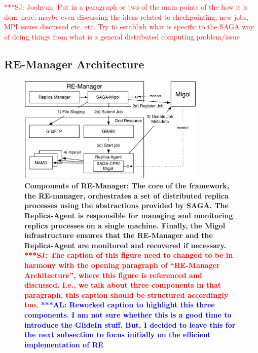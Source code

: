 \documentclass{rspublic}
\newcommand{\alnote}[1]{ {\textcolor{blue} { ***AL: #1 }}}
\newcommand{\jhanote}[1]{ {\textcolor{red} { ***SJ: #1 }}}
\newcommand{\alnote}[1]{}
\newcommand{\jhanote}[1]{}
\begin{document}
\jhanote{Joohyun: Put in a paragraph or two of the main points of the
  how it is done here; maybe even discussing the ideas related to
  checkpointing, new jobs, MPI issues discussed etc. etc. Try to
  establish what is specific to the SAGA way of doing things from what
  is a general distributed computing problem/issue}
          
\subsection{RE-Manager Architecture}
\begin{figure}[t]
      \centering
          \includegraphics[width=0.8\textwidth]{REMDgManager-architecture.pdf}
          \caption{\footnotesize \bf Components of RE-Manager: The
            core of the framework, the RE-manager, orchestrates 
            a set of distributed replica processes using the abstractions provided
            by SAGA. The Replica-Agent is responsible for managing and monitoring 
            replica processes on a single machine. Finally, the Migol 
            infrastructure ensures that the RE-Manager and the Replica-Agent 
            are monitored and recovered if necessary.            
            \jhanote{The caption of this
              figure need to changed to be in harmony with the opening
              paragraph of ``RE-Manager Architecture'', where this
              figure is referenced and discussed. I.e., we talk about
              three components in that paragraph, this caption should
              be structured accordingly too.}
              \alnote{Reworked caption to highlight this three components. 
              I am not sure whether this is a good time to introduce the GlideIn stuff. But, I 
              decided to leave this for the next subsection to focus initially on
              the efficient implementation of RE}
              }
      \label{fig:REMD-Manager-architecture}
\end{figure}
\end{document}
